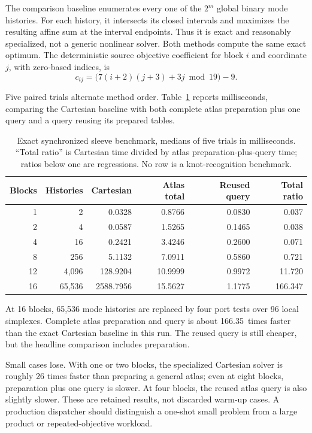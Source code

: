 \documentclass[11pt,a4paper]{article}
\theoremstyle{definition}
\theoremstyle{remark}
\newcommand{\ModeRatio}{166.35}
\begin{document}
The comparison baseline enumerates every one of the $2^m$ global binary mode histories. For each history, it intersects its closed intervals and maximizes the resulting affine sum at the interval endpoints. Thus it is exact and reasonably specialized, not a generic nonlinear solver. Both methods compute the same exact optimum. The deterministic source objective coefficient for block $i$ and coordinate $j$, with zero-based indices, is
\[
 c_{ij}=\bigl(7(i+2)(j+3)+3j\bmod19\bigr)-9.
\]

Five paired trials alternate method order. Table~\ref{tab:modes} reports milliseconds, comparing the Cartesian baseline with both complete atlas preparation plus one query and a query reusing its prepared tables.

\begin{table}[ht]
\centering\small

\begin{tabular}{@{}rrrrrr@{}}
\toprule
Blocks & Histories & Cartesian & Atlas total & Reused query & Total ratio\\
\midrule
1 & 2 & 0.0328 & 0.8766 & 0.0830 & 0.037\\
2 & 4 & 0.0587 & 1.5265 & 0.1465 & 0.038\\
4 & 16 & 0.2421 & 3.4246 & 0.2600 & 0.071\\
8 & 256 & 5.1132 & 7.0911 & 0.5860 & 0.721\\
12 & 4,096 & 128.9204 & 10.9999 & 0.9972 & 11.720\\
16 & 65,536 & 2588.7956 & 15.5627 & 1.1775 & 166.347\\
\bottomrule
\end{tabular}


\caption{Exact synchronized sleeve benchmark, medians of five trials in milliseconds. ``Total ratio'' is Cartesian time divided by atlas preparation-plus-query time; ratios below one are regressions. No row is a knot-recognition benchmark.}
\label{tab:modes}
\end{table}

At 16 blocks, 65,536 mode histories are replaced by four port tests over 96 local simplexes. Complete atlas preparation and query is about \ModeRatio\ times faster than the exact Cartesian baseline in this run. The reused query is still cheaper, but the headline comparison includes preparation.

Small cases lose. With one or two blocks, the specialized Cartesian solver is roughly 26 times faster than preparing a general atlas; even at eight blocks, preparation plus one query is slower. At four blocks, the reused atlas query is also slightly slower. These are retained results, not discarded warm-up cases. A production dispatcher should distinguish a one-shot small problem from a large product or repeated-objective workload.
\end{document}
